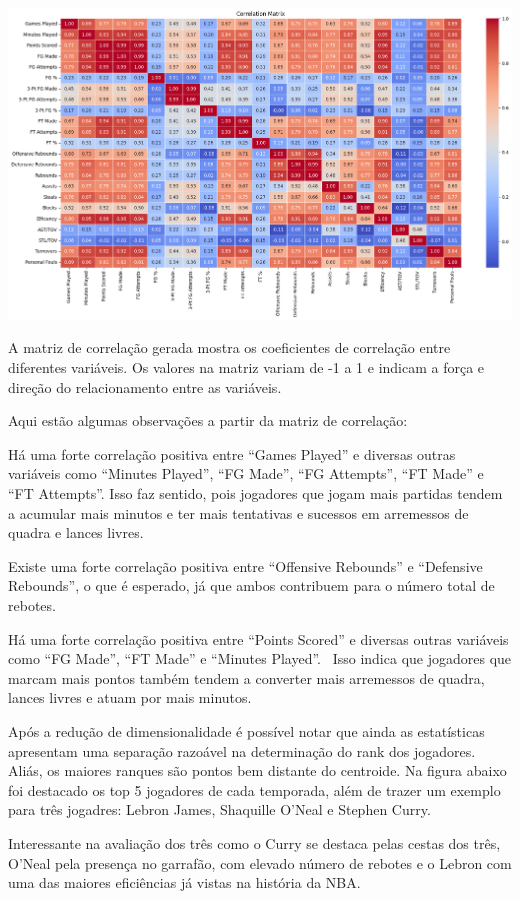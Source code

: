 \documentclass[
]{book}
\begin{document}
\includegraphics{imagens/5.png}

A matriz de correlação gerada mostra os coeficientes de correlação entre diferentes variáveis. Os valores na matriz variam de -1 a 1 e indicam a força e direção do relacionamento entre as variáveis.

Aqui estão algumas observações a partir da matriz de correlação:

Há uma forte correlação positiva entre ``Games Played'' e diversas outras variáveis como ``Minutes Played'', ``FG Made'', ``FG Attempts'', ``FT Made'' e ``FT Attempts''. Isso faz sentido, pois jogadores que jogam mais partidas tendem a acumular mais minutos e ter mais tentativas e sucessos em arremessos de quadra e lances livres.

Existe uma forte correlação positiva entre ``Offensive Rebounds'' e ``Defensive Rebounds'', o que é esperado, já que ambos contribuem para o número total de rebotes.

Há uma forte correlação positiva entre ``Points Scored'' e diversas outras variáveis como ``FG Made'', ``FT Made'' e ``Minutes Played''. ~Isso indica que jogadores que marcam mais pontos também tendem a converter mais arremessos de quadra, lances livres e atuam por mais minutos.

Após a redução de dimensionalidade é possível notar que ainda as estatísticas apresentam uma separação razoável na determinação do rank dos jogadores. Aliás, os maiores ranques são pontos bem distante do centroide. Na figura abaixo foi destacado os top 5 jogadores de cada temporada, além de trazer um exemplo para três jogadres: Lebron James, Shaquille O'Neal e Stephen Curry.

Interessante na avaliação dos três como o Curry se destaca pelas cestas dos três, O'Neal pela presença no garrafão, com elevado número de rebotes e o Lebron com uma das maiores eficiências já vistas na história da NBA.
\end{document}
